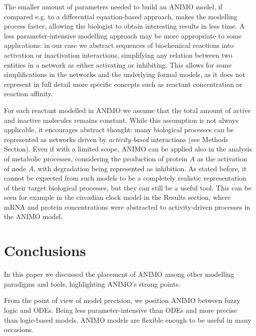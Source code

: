 \documentclass{bmcart}
\begin{document}
The smaller amount of parameters needed to build an ANIMO model, if compared e.g. to
a differential equation-based approach, makes the modelling process faster, allowing
the biologist to obtain interesting results in less time. A less
parameter-intensive modelling approach may be more appropriate to some applications:
in our case we abstract
sequences of biochemical reactions into activation or inactivation interactions,
simplifying any relation between two entities in a network as either activating or
inhibiting. This allows for some simplifications in the networks and the underlying
formal models, as it does not represent in full detail more specific concepts
such as reactant concentration or reaction affinity.

For each reactant modelled in ANIMO we assume that the total amount
of active and inactive molecules remains constant.
While this assumption is not always applicable, it encourages
abstract thought: many biological processes can be represented as networks driven by
\emph{activity-based} interactions (see Methods Section). Even if with a limited scope, ANIMO can be applied
also in the analysis of metabolic processes, considering the production of protein $A$ as
the activation of node $A$, with degradation being represented as inhibition. As stated before,
it cannot be expected from such models to be a completely realistic representation of their target biological
processes, but they can still be a useful tool. This can be seen for example in the circadian clock
model in the Results section, where mRNA and protein concentrations were abstracted to
activity-driven processes in the ANIMO model.





\section*{Conclusions}

In this paper we discussed the placement of ANIMO among other modelling paradigms and tools,
highlighting ANIMO's strong points.

From the point of view of model precision, we position ANIMO between fuzzy logic and ODEs.
Being less parameter-intensive than ODEs and more precise than logic-based models,
ANIMO models are flexible enough to be useful in many occasions.
\end{document}
